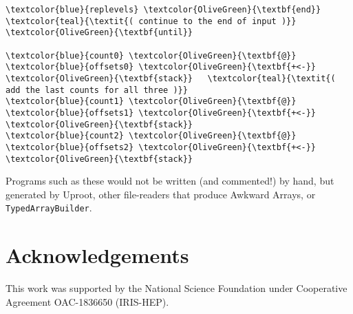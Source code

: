 \documentclass{webofc}
\begin{document}
\begin{Verbatim}[commandchars=\\\{\}]
  \textcolor{blue}{replevels} \textcolor{OliveGreen}{\textbf{end}}               \textcolor{teal}{\textit{( continue to the end of input )}}
\textcolor{OliveGreen}{\textbf{until}}

\textcolor{blue}{count0} \textcolor{OliveGreen}{\textbf{@}} \textcolor{blue}{offsets0} \textcolor{OliveGreen}{\textbf{+<-}} \textcolor{OliveGreen}{\textbf{stack}}   \textcolor{teal}{\textit{( add the last counts for all three )}}
\textcolor{blue}{count1} \textcolor{OliveGreen}{\textbf{@}} \textcolor{blue}{offsets1} \textcolor{OliveGreen}{\textbf{+<-}} \textcolor{OliveGreen}{\textbf{stack}}
\textcolor{blue}{count2} \textcolor{OliveGreen}{\textbf{@}} \textcolor{blue}{offsets2} \textcolor{OliveGreen}{\textbf{+<-}} \textcolor{OliveGreen}{\textbf{stack}}
\end{Verbatim}

Programs such as these would not be written (and commented!) by hand, but generated by Uproot, other file-readers that produce Awkward Arrays, or \texttt{TypedArrayBuilder}.

\section{Acknowledgements}

This work was supported by the National Science Foundation under Cooperative Agreement OAC-1836650 (IRIS-HEP).






\end{document}
